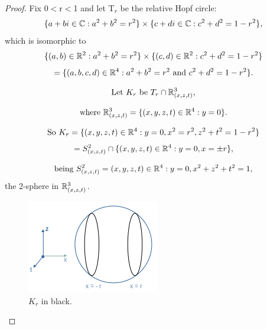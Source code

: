 \begin{proof} \label{proofHopfStereo}
Fix 0$<$r$<$1 and let T$_{r}$ be the relative Hopf circle:
\begin{equation*}
\{a+bi \in \mathbb{C} : a^2+b^2 = r^2 \} \times \{c+di \in \mathbb{C} : c^2+d^2 = 1 - r^2 \},    
\end{equation*}
which is isomorphic to 
\begin{equation*}
    \{(a,b) \in \mathbb{R}^2 : a^2+b^2 = r^2 \} \times \{(c,d) \in \mathbb{R}^2 : c^2+d^2 = 1 - r^2 \} 
\end{equation*}
\begin{equation*}
    = \{(a,b,c,d) \in \mathbb{R}^4 : a^2+b^2 = r^2\mbox{ and }c^2+d^2 = 1 - r^2\}.
\end{equation*}

\begin{equation*}
    \mbox{Let } K_{r} \mbox{ be }T_{r} \cap \mathbb{R}^3_{(x,z,t)},
\end{equation*}

\begin{equation*}
    \mbox{where }\mathbb{R}^3_{(x,z,t)} = \{(x,y,z,t) \in \mathbb{R}^4 : y=0\}.
\end{equation*}


\begin{equation*}
\mbox{So }K_{r} = \{(x,y,z,t) \in \mathbb{R}^4 : y=0, x^2=r^2, z^2+t^2 = 1-r^2\}    
\end{equation*}
\begin{equation*}
    = S^2_{(x,z,t)} \cap \{(x,y,z,t) \in \mathbb{R}^4 : y=0, x=\pm r \},
\end{equation*}

\begin{equation*}
\mbox{being }S^2_{(x,z,t)} = {(x,y,z,t) \in \mathbb{R}^4 : y=0, x^2+z^2+t^2=1}, 
\end{equation*}
the 2-sphere in $\mathbb{R}^3_{(x,z,t)}$. 

\begin{figure}[H]
    \centering
    \includegraphics[scale=0.75]{Kr.png}
    \caption{$K_{r}$ in black.}
    \label{fig:Kr}
\end{figure}




\end{proof}
